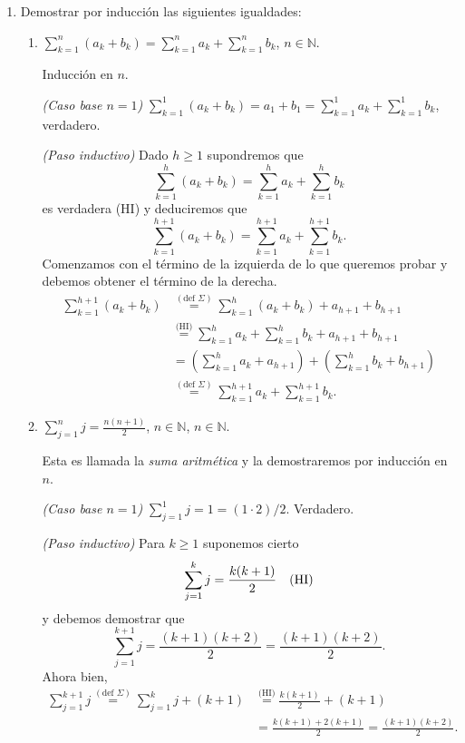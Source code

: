 \begin{enumerate}
\begin{enumerate}
        
    \end{enumerate}
  
    
    \item\label{ej-induccion} Demostrar por inducción  las siguientes igualdades:
    \begin{enumerate}
        \item  $\displaystyle{ \sum_{k=1}^n (a_k + b_k) = \sum_{k=1}^n a_k + \sum_{k=1}^n b_k}$, $n\in \mathbb N$.
        
        \rta Inducción en $n$.
        
        \textit{(Caso base $n=1$) }  $\sum_{k=1}^1 (a_k + b_k) = a_1+b_1 = \sum_{k=1}^1 a_k + \sum_{k=1}^1 b_k$, verdadero.
        
        \textit{(Paso inductivo)} Dado $h \ge 1$ supondremos  que 
        $$\sum_{k=1}^h (a_k + b_k) = \sum_{k=1}^h a_k + \sum_{k=1}^h b_k$$ es verdadera (HI) y deduciremos que $$\sum_{k=1}^{h+1} (a_k + b_k) = \sum_{k=1}^{h+1} a_k + \sum_{k=1}^{h+1} b_k.$$
        Comenzamos con el término de la izquierda de lo que queremos probar  y debemos obtener el término de la derecha. 
        \begin{align*}
            \sum_{k=1}^{h+1} (a_k + b_k) &\overset{(\text{def } \Sigma)}{=}  \sum_{k=1}^h (a_k + b_k) + a_{h+1} + b_{h+1}\\ &\overset{\text{(HI)}}{=} \sum_{k=1}^h a_k + \sum_{k=1}^h b_k + a_{h+1} + b_{h+1}
            \\&= ( \sum_{k=1}^h a_k+a_{h+1} ) + ( \sum_{k=1}^h b_k + b_{h+1}) \\&\overset{(\text{def } \Sigma)}{=} \sum_{k=1}^{h+1} a_k + \sum_{k=1}^{h+1} b_k.
        \end{align*}
        
        
        \item\label{ej-serie-aritmetica}  $\displaystyle{ \sum_{j=1}^n j = \frac{n(n+1)}{2}}$, $n\in \mathbb N$, $n\in \mathbb N$.
        
        \rta Esta es llamada la \textit{suma aritmética} y la demostraremos por inducción en $n$.
        
        \textit{(Caso base $n=1$) } $ \sum_{j=1}^1 j = 1 = (1 \cdot 2)/2$. Verdadero. 
        
        \textit{(Paso inductivo)} Para $k \ge 1$ suponemos cierto $$\sum_{j=1}^k j = \frac{k(k+1)}{2} \text{\quad (HI)}$$  y  debemos demostrar  que $$\sum_{j=1}^{k+1} j = \frac{(k+1)(k+2)}{2} = \frac{(k+1)(k+2)}{2}.$$ Ahora bien,
        \begin{align*}
            \sum_{j=1}^{k+1} j \overset{(\text{def } \Sigma)}{=} \sum_{j=1}^k j + (k+1)&  \overset{\text{(HI)}}{=} \frac{k(k+1)}{2} + (k+1) \\&= \frac{k(k+1) +2(k+1)}{2} = \frac{(k+1)(k +2)}{2}. 
        \end{align*}
        

\end{enumerate}
\end{enumerate}
